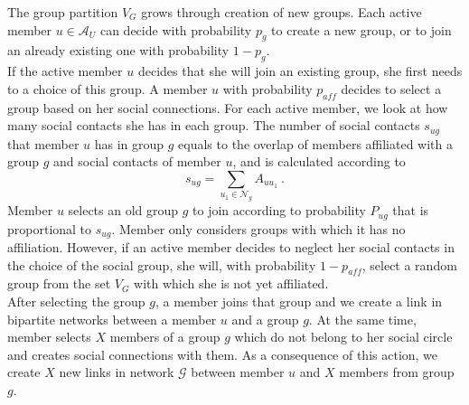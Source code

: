 The group partition $V_{G}$ grows through creation of new groups. Each active member $u\in \mathcal{A}_{U}$ can decide with probability $p_{g}$ to create a new group, or to join an already existing one with probability $1-p_{g}$. \\


If the active member $u$ decides that she will join an existing group, she first needs to a choice of this group. A member $u$ with probability $p_{aff}$ decides to select a group based on her social connections. For each active member, we look at how many social contacts she has in each group. The number of social contacts $s_{ug}$ that member $u$ has in group $g$ equals to the overlap of members affiliated with a group $g$ and social contacts of member $u$, and is calculated according to
\begin{equation}
s_{ug}=\sum_{u_{1}\in \mathcal{N}_{g}}
A_{uu_{1}} \label{eq1} \ .
\end{equation}
Member $u$ selects an old group $g$ to join according to probability $P_{ug}$ that is proportional to $s_{ug}$. Member only considers groups with which it has no affiliation. However, if an active member decides to neglect her social contacts in the choice of the social group, she will, with probability $1-p_{aff}$, select a random group from the set $V_{G}$ with which she is not yet affiliated. \\

After selecting the group $g$, a member joins that group and we create a link in bipartite networks between a member $u$ and a group $g$. At the same time, member selects $X$ members of a group $g$ which do not belong to her social circle and creates social connections with them. As a consequence of this action, we create $X$ new links in network $\mathcal{G}$ between member $u$ and $X$ members from group $g$.\\

